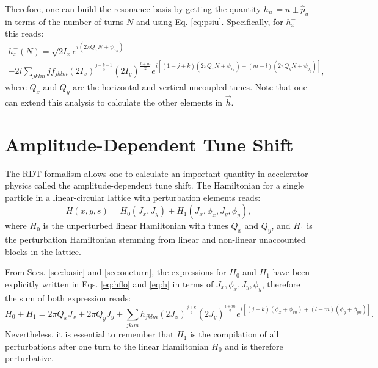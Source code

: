Therefore, one can build the resonance basis by getting the quantity $h_u^{\pm}=\hat{u}\pm \hat{p}_u$ in terms of the number of turns $N$ and using Eq. \ref{eq:psiu}. Specifically, for $h_x^{-}$ this reads:
\begin{multline}
    \label{eq:hx-}
    h_x^{-}(N)=\sqrt{2I_x}e^{i\left( 2\pi Q_x N +\psi_{x_0}\right)} \\
    -2i \sum_{jklm} j f_{jklm} \left( 2I_x \right)^{\frac{j+k-1}{2}}\left( 2I_y \right)^{\frac{l+m}{2}}
    e^{i \left[ \left( 1-j+k\right)\left( 2\pi Q_x N + \psi_{x_0} \right) +\left( m-l\right)\left( 2\pi Q_y N + \psi_{y_0} \right)\right]},
\end{multline}
where $Q_x$ and $Q_y$ are the horizontal and vertical uncoupled tunes. Note that one can extend this analysis to calculate the other elements in $\vec{h}$.  

\section{\label{sec:amp}Amplitude-Dependent Tune Shift}
The RDT formalism allows one to calculate an important quantity in accelerator physics called the amplitude-dependent tune shift. The Hamiltonian for a single particle in a linear-circular lattice with perturbation elements reads: 
\begin{equation}
    \label{eq:hh}
    H(x,y,s)=H_{0}(J_x,J_y)+H_{1}(J_x, \phi_x, J_y, \phi_y), 
\end{equation} 
where $H_0$ is the unperturbed linear Hamiltonian with tunes $Q_x$ and $Q_y$, and $H_1$ is the perturbation Hamiltonian stemming from linear and non-linear unaccounted blocks in the lattice.

From Secs. \ref{sec:basic} and \ref{sec:oneturn}, the expressions for $H_0$ and $H_1$ have been explicitly written in Eqs. \ref{eq:hflo} and \ref{eq:h} in terms of $J_x,\phi_x,J_y,\phi_y$, therefore the sum of both expression reads:
\begin{equation}
    \label{eq:h0h1}
    H_0+H_1=2\pi Q_x J_x + 2\pi Q_y J_y + \sum_{jklm} h_{jklm} \left( 2 J_x\right)^{\frac{j+k}{2}} \left( 2 J_y\right)^{\frac{l+m}{2}} e^{i\left[ \left( j-k \right)\left( \phi_x+\phi_{x0} \right)+ \left( l-m \right) \left( \phi_y+\phi_{y0} \right)\right]}.
\end{equation}
Nevertheless, it is essential to remember that $H_1$ is the compilation of all perturbations after one turn to the linear Hamiltonian $H_0$ and is therefore perturbative. 

